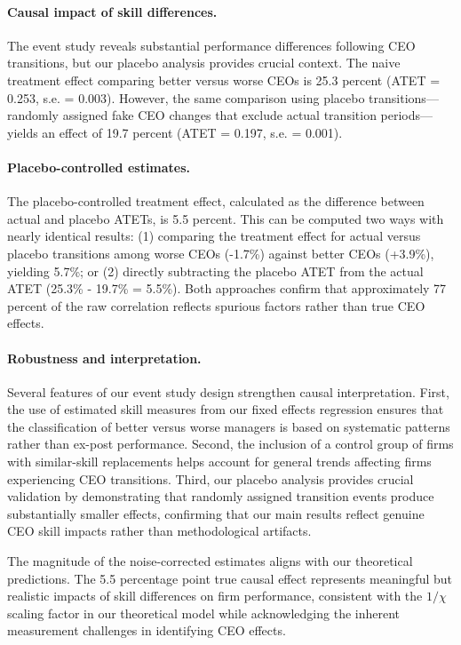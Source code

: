 \documentclass[11pt,a4paper]{article}
\begin{document}
\paragraph{Causal impact of skill differences.} The event study reveals substantial performance differences following CEO transitions, but our placebo analysis provides crucial context. The naive treatment effect comparing better versus worse CEOs is 25.3 percent (ATET = 0.253, s.e. = 0.003). However, the same comparison using placebo transitions---randomly assigned fake CEO changes that exclude actual transition periods---yields an effect of 19.7 percent (ATET = 0.197, s.e. = 0.001).

\paragraph{Placebo-controlled estimates.} The placebo-controlled treatment effect, calculated as the difference between actual and placebo ATETs, is 5.5 percent. This can be computed two ways with nearly identical results: (1) comparing the treatment effect for actual versus placebo transitions among worse CEOs (-1.7\%) against better CEOs (+3.9\%), yielding 5.7\%; or (2) directly subtracting the placebo ATET from the actual ATET (25.3\% - 19.7\% = 5.5\%). Both approaches confirm that approximately 77 percent of the raw correlation reflects spurious factors rather than true CEO effects.

\paragraph{Robustness and interpretation.} Several features of our event study design strengthen causal interpretation. First, the use of estimated skill measures from our fixed effects regression ensures that the classification of better versus worse managers is based on systematic patterns rather than ex-post performance. Second, the inclusion of a control group of firms with similar-skill replacements helps account for general trends affecting firms experiencing CEO transitions. Third, our placebo analysis provides crucial validation by demonstrating that randomly assigned transition events produce substantially smaller effects, confirming that our main results reflect genuine CEO skill impacts rather than methodological artifacts.

The magnitude of the noise-corrected estimates aligns with our theoretical predictions. The 5.5 percentage point true causal effect represents meaningful but realistic impacts of skill differences on firm performance, consistent with the $1/\chi$ scaling factor in our theoretical model while acknowledging the inherent measurement challenges in identifying CEO effects.
\end{document}
